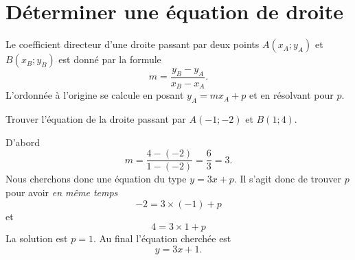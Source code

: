 \section{Déterminer une équation de droite}

%
%
\begin{Aretenir}
    Le coefficient directeur d'une droite passant par deux points \( A(x_A;y_A)\) et \( B(x_B;y_B)\) est donné par la formule
    \begin{equation}
        m=\frac{ y_B-y_A }{ x_B-x_A }.
    \end{equation}
    L'ordonnée à l'origine se calcule en posant \( y_A=mx_A+p\) et en résolvant pour \( p\).
\end{Aretenir}

\begin{example}
    Trouver l'équation de la droite passant par \( A(-1;-2)\) et \( B(1;4)\).

    D'abord
    \begin{equation}
        m=\frac{ 4-(-2) }{ 1-(-2) }=\frac{ 6 }{ 3 }=3.
    \end{equation}
    Nous cherchons donc une équation du type \( y=3x+p\). Il s'agit donc de trouver \( p\) pour avoir \emph{en même temps}
    \begin{equation}
            -2=3\times (-1)+p
    \end{equation}
    et
    \begin{equation}
        4=3\times 1+p
    \end{equation}
    La solution est \( p=1\). Au final l'équation cherchée est
    \begin{equation}
        y=3x+1.
    \end{equation}
    
\end{example}



